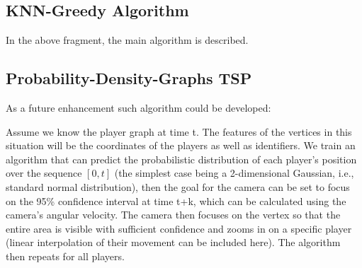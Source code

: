 \pagebreak
\subsection{KNN-Greedy Algorithm}



In the above fragment, the main algorithm is described. 

\subsection{Probability-Density-Graphs TSP}
As a future enhancement such algorithm could be developed:

Assume we know the player graph at time t. The features of the vertices in this situation will be the coordinates of the players as well as identifiers. We train an algorithm that can predict the probabilistic distribution of each player's position over the sequence $[0,t]$ (the simplest case being a 2-dimensional Gaussian, i.e., standard normal distribution), then the goal for the camera can be set to focus on the 95\% confidence interval at time t+k, which can be calculated using the camera's angular velocity. The camera then focuses on the vertex so that the entire area is visible with sufficient confidence and zooms in on a specific player (linear interpolation of their movement can be included here). The algorithm then repeats for all players.